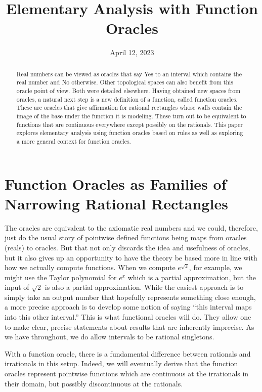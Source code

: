\documentclass[12pt]{article}
\title{Elementary Analysis with Function Oracles}
\date{April 12, 2023}
\begin{document}
\maketitle
\begin{abstract}
Real numbers can be viewed as oracles that say Yes to an interval which contains the real number and No otherwise. Other topological spaces can also benefit from this oracle point of view.  Both were detailed elsewhere. Having obtained new spaces from oracles, a natural next step is a new definition of a function, called function oracles. These are oracles that give affirmation for rational rectangles whose walls contain the image of the base under the function it is modeling. These turn out to be equivalent to functions that are continuous everywhere except possibly on the rationals. This paper explores elementary analysis using function oracles based on rules as well as exploring a more general context for function oracles. 
\end{abstract}

\tableofcontents


\section{Function Oracles as Families of Narrowing Rational Rectangles}\label{sec:funora}

The oracles are equivalent to the axiomatic real numbers and we could, therefore, just do the usual story of pointwise defined functions being maps from oracles (reals) to oracles. But that not only discards the idea and usefulness of oracles, but it also gives up an opportunity to have the theory be based more in line with how we actually compute functions. When we compute $e^{\sqrt{2}}$, for example, we might use the Taylor polynomial for $e^x$ which is a partial approximation, but the input of $\sqrt{2}$ is also a partial approximation. While the easiest approach is to simply take an output number that hopefully represents something close enough, a more precise approach is to develop some notion of saying ``this interval maps into this other interval.'' This is what functional oracles will do. They allow one to make clear, precise statements about results that are inherently imprecise. As we have throughout, we do allow intervals to be rational singletons. 

With a function oracle, there is a fundamental difference between rationals and irrationals in this setup. Indeed, we will eventually derive that the function oracles represent pointwise functions which are continuous at the irrationals in their domain, but possibly discontinuous at the rationals.
\end{document}
